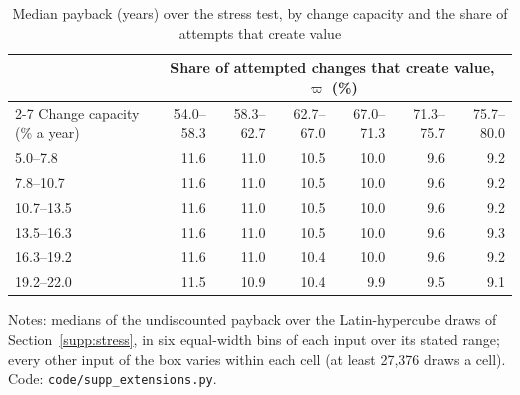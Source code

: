 \begin{table}[!ht]\centering\footnotesize\setlength{\tabcolsep}{4pt}
\caption{Median payback (years) over the stress test, by change capacity and the share of attempts that create value}\label{tab:ext-payback}
\begin{tabular}{@{}lrrrrrr@{}}\toprule
& \multicolumn{6}{c}{Share of attempted changes that create value, $\varpi$ (\%)}\\\cmidrule(l){2-7}
Change capacity (\% a year) & 54.0--58.3 & 58.3--62.7 & 62.7--67.0 & 67.0--71.3 & 71.3--75.7 & 75.7--80.0\\\midrule
5.0--7.8 & 11.6 & 11.0 & 10.5 & 10.0 & 9.6 & 9.2\\
7.8--10.7 & 11.6 & 11.0 & 10.5 & 10.0 & 9.6 & 9.2\\
10.7--13.5 & 11.6 & 11.0 & 10.5 & 10.0 & 9.6 & 9.2\\
13.5--16.3 & 11.6 & 11.0 & 10.5 & 10.0 & 9.6 & 9.3\\
16.3--19.2 & 11.6 & 11.0 & 10.4 & 10.0 & 9.6 & 9.2\\
19.2--22.0 & 11.5 & 10.9 & 10.4 & 9.9 & 9.5 & 9.1\\
\bottomrule\end{tabular}
\par\vspace{2pt}\footnotesize\raggedright Notes: medians of the undiscounted payback over the \StDraws{} Latin-hypercube draws of Section~\ref{supp:stress}, in six equal-width bins of each input over its stated range; every other input of the box varies within each cell (at least 27{,}376 draws a cell). Code: \texttt{code/supp\_extensions.py}.
\end{table}
